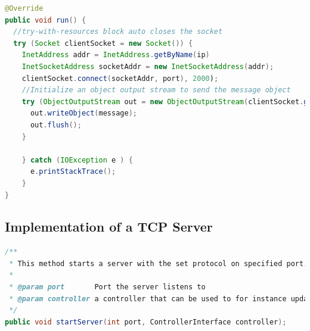 \begin{minipage}{\linewidth}
	\begin{lstlisting}[language=Java, caption={TCP sendMessageTask implementation},captionpos=b,label=lst:TCPMessageTask]
@Override
public void run() {
  //try-with-resources block auto closes the socket
  try (Socket clientSocket = new Socket()) {
    InetAddress addr = InetAddress.getByName(ip)
    InetSocketAddress socketAddr = new InetSocketAddress(addr);
    clientSocket.connect(socketAddr, port), 2000);
    //Initialize an object output stream to send the message object
    try (ObjectOutputStream out = new ObjectOutputStream(clientSocket.getOutputStream())) {
      out.writeObject(message);
      out.flush();
    }
			
    } catch (IOException e ) {
      e.printStackTrace();
    }
}
	\end{lstlisting}
\end{minipage}

\subsection{Implementation of a TCP Server}
\begin{lstlisting}[language=Java, caption={Interface prescribes a sendMessage method},captionpos=b,label=lst:sendMessageI]
/**
 * This method starts a server with the set protocol on specified port. The controller will be used to update the interface, especially with received messages.
 *
 * @param port       Port the server listens to
 * @param controller a controller that can be used to for instance update the GUI, display received messages
 */
public void startServer(int port, ControllerInterface controller);
\end{lstlisting}


